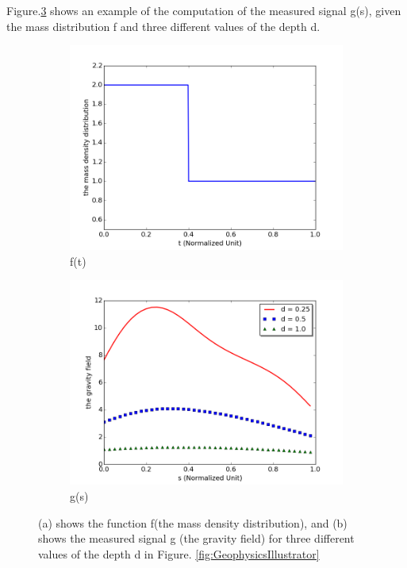 \documentclass{article}
\begin{document}
Figure.\ref{fig:geoexact} shows an example of the computation of the measured
signal g(s), given the mass distribution f and three different values of the
depth d.

\begin{figure}
	\centering
		\begin{subfigure}[b]{0.7\textwidth}
			\includegraphics[width=\textwidth]{images/FexactPlot/fexactplot}
			\caption{f(t)}
			\label{fig:f(t)}
		\end{subfigure}
		\begin{subfigure}[b]{0.7\textwidth}
			\includegraphics[width=\textwidth]{images/GexactPlot/gexactplot}
			\caption{g(s)}
			\label{fig:g(s)}
		\end{subfigure}
		\caption{(a) shows the function f(the mass density
		distribution), and (b) shows the measured signal g (the
		gravity field) for three different values of the depth d in Figure.
		\ref{fig:GeophysicsIllustrator}}\label{fig:geoexact}
\end{figure}
\end{document}
